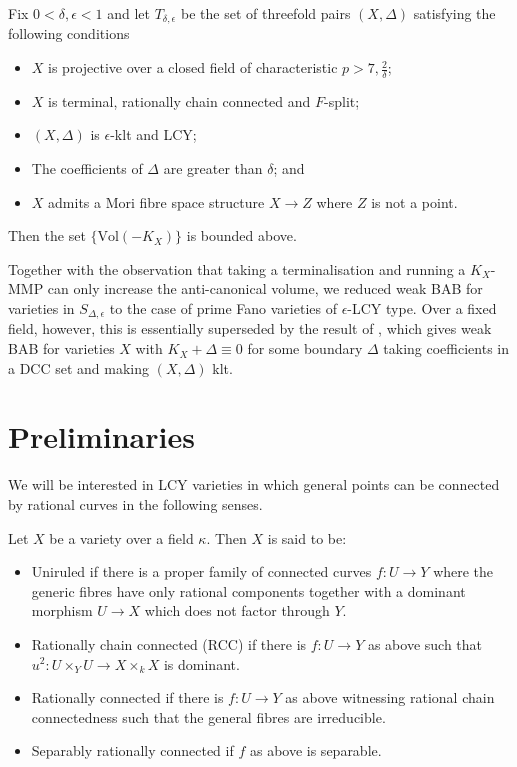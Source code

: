\documentclass[a4paper,12pt]{book}
\newcommand{\D}{\Delta}
\newcommand{\Vol}{\text{Vol}}
\newcommand\myworries[1]{\textcolor{red}{#1}}
\begin{document}
\begin{theorem}\label{Main2}
	Fix $0 < \delta, \epsilon <1$ and let $T_{\delta,\epsilon}$ be the set of threefold pairs $(X,\Delta)$ satisfying the following conditions
	\begin{itemize}
		\item $X$ is projective over a closed field of characteristic $p >7,\frac{2}{\delta}$;
		\item $X$ is terminal, rationally chain connected and $F$-split;
		\item $(X,\Delta)$ is $\epsilon$-klt and LCY;
		\item The coefficients of $\Delta$ are greater than $\delta$; and
		\item $X$ admits a Mori fibre space structure $X \to Z$ where $Z$ is not a point.
	\end{itemize}
	Then the set $\{\Vol(-K_{X})\}$ is bounded above. 
\end{theorem}
\begin{remark}
	Together with the observation that taking a terminalisation and running a $K_{X}$-MMP can only increase the anti-canonical volume, we reduced weak BAB for varieties in $S_{\D,\epsilon}$ to the case of prime Fano varieties of $\epsilon$-LCY type. Over a fixed field, however, this is essentially superseded by the result of \cite{das2018boundedness}, which gives weak BAB for varieties $X$ with $K_{X}+\D \equiv 0$ for some boundary $\D$ taking coefficients in a DCC set and making $(X,\D)$ klt. 
\end{remark}

\section{Preliminaries}

We will be interested in LCY varieties in which general points can be connected by rational curves in the following senses.

\begin{definition}
	Let $X$ be a variety over a field $\kappa$. Then $X$ is said to be:
	\begin{itemize}
		\item Uniruled if there is a proper family of connected curves $f\colon U \to Y$ where the generic fibres have only rational components together with a dominant morphism $U \to X$ which does not factor through $Y$.
		\item Rationally chain connected (RCC) if there is $f\colon U \to Y$ as above such that $u^{2}\colon U \times_{Y} U \to X \times_{k} X$ is dominant.
		\item Rationally connected if there is $f\colon U \to Y$ as above witnessing rational chain connectedness such that the general fibres are irreducible.
		\item Separably rationally connected if $f$ as above is separable.
	\end{itemize}
\end{definition}
\end{document}
